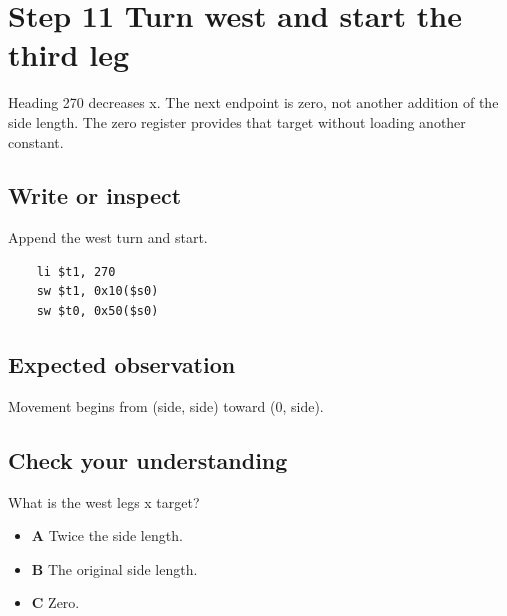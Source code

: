 \section{Step 11 Turn west and start the third
  leg}\label{006-marsbot-square-s11-step-11-turn-west-and-start-the-third-leg}

Heading 270 decreases x. The next endpoint is zero, not another addition
of the side length. The zero register provides that target without
loading another constant.

\subsection{Write or
  inspect}\label{006-marsbot-square-s11-write-or-inspect}

Append the west turn and start.

\begin{verbatim}
    li $t1, 270
    sw $t1, 0x10($s0)
    sw $t0, 0x50($s0)
\end{verbatim}

\subsection{Expected
  observation}\label{006-marsbot-square-s11-expected-observation}

Movement begins from (side, side) toward (0, side).

\subsection{Check your
  understanding}\label{006-marsbot-square-s11-check-your-understanding}

What is the west leg\textquotesingle s x target?

\begin{itemize}
  \tightlist
  \item
        \textbf{A} Twice the side length.
  \item
        \textbf{B} The original side length.
  \item
        \textbf{C} Zero.
\end{itemize}
